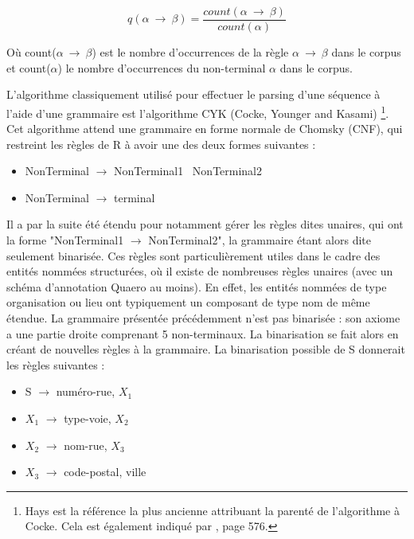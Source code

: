\documentclass[12pt,a4paper,times,twoside,openright]{report}
\begin{document}
\begin{equation}
q(\alpha\ \rightarrow\ \beta) = \frac{count(\alpha\ \rightarrow\ \beta)}{count(\alpha)}
\end{equation}

Où count($\alpha\ \rightarrow\ \beta$) est le nombre d'occurrences de la règle $\alpha\ \rightarrow\ \beta$ dans le corpus et count($\alpha$) le nombre d'occurrences du non-terminal $\alpha$ dans le corpus.

L'algorithme classiquement utilisé pour effectuer le parsing d'une séquence à l'aide d'une grammaire est l'algorithme CYK (Cocke, Younger and Kasami) \citep{hays1962automatic,kasami1965efficient,younger1967recognition}\footnote{Hays est la référence la plus ancienne attribuant la parenté de l'algorithme à Cocke. Cela est également indiqué par \citet{jacobs1990parsing}, page 576.}. Cet algorithme attend une grammaire en forme normale de Chomsky (CNF), qui restreint les règles de R à avoir une des deux formes suivantes :

\begin{itemize}
    \item NonTerminal $\rightarrow$ NonTerminal1 \ NonTerminal2
    \item NonTerminal $\rightarrow$ terminal
\end{itemize}

Il a par la suite été étendu \citep{chappelier1998generalized} pour notamment gérer les règles dites unaires, qui ont la forme "NonTerminal1 $\rightarrow$ NonTerminal2", la grammaire étant alors dite seulement binarisée. Ces règles sont particulièrement utiles dans le cadre des entités nommées structurées, où il existe de nombreuses règles unaires (avec un schéma d'annotation Quaero au moins). En effet, les entités nommées de type organisation ou lieu ont typiquement un composant de type nom de même étendue. La grammaire présentée précédemment n'est pas binarisée : son axiome a une partie droite comprenant 5 non-terminaux. La binarisation se fait alors en créant de nouvelles règles à la grammaire. La binarisation possible de S donnerait les règles suivantes :
\begin{itemize}
    \item S $\rightarrow$ numéro-rue, $X_{1}$
    \item $X_{1}$ $\rightarrow$ type-voie, $X_{2}$
    \item $X_{2}$ $\rightarrow$ nom-rue, $X_{3}$
    \item $X_{3}$ $\rightarrow$ code-postal, ville
\end{itemize}
\end{document}
